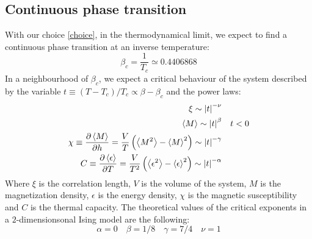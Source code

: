 \documentclass[11pt]{scrartcl} %
\begin{document}
\subsection{Continuous phase transition}
With our choice \eqref{choice}, in the thermodynamical limit, we expect to find a continuous phase transition at an inverse temperature:
\begin{equation}
	\beta _c = \frac{1}{T_c} \simeq 0.4406868
\end{equation}
In a neighbourhood of $\beta _c$, we expect a critical behaviour of the system described by the variable $t\equiv (T-T_c)/T_c \propto\beta - \beta _c$ and the power laws:
\begin{eqnarray}
	\xi \sim \left\lvert t\right\rvert^{-\nu} & \\
	\left\langle M \right\rangle \sim \left\lvert t\right\rvert ^{\beta} & \quad t<0\\
	\chi \equiv \frac{\partial \left\langle M \right\rangle}{\partial h} = \frac{V}{T}\left(\left\langle M^2 \right\rangle-\left\langle M \right\rangle ^2\right)\sim \left\lvert t\right\rvert ^{-\gamma} & \\
	C \equiv \frac{\partial \left\langle \epsilon \right\rangle}{\partial T} = \frac{V}{T^2}\left(\left\langle \epsilon^2 \right\rangle-\left\langle \epsilon \right\rangle ^2\right) \sim \left\lvert t\right\rvert^{-\alpha} &
\end{eqnarray}
Where $\xi$ is the correlation length, $V$ is the volume of the system, $M$ is the magnetization density, $\epsilon$ is the energy density, $\chi$ is the magnetic susceptibility and $C$ is the thermal capacity.
The theoretical values of the critical exponents in a $2$-dimensionsonal Ising model are the following:
\begin{equation}
\alpha = 0 \quad \beta = 1/8 \quad \gamma = 7/4 \quad \nu =1
\end{equation}
\end{document}
